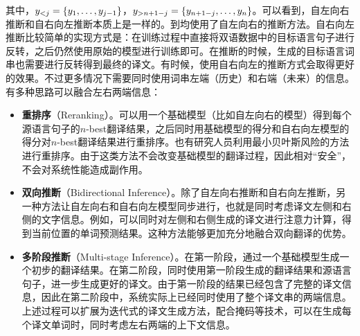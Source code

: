 \noindent 其中，${y}_{<j}=\{y_1,\dots,y_{j-1}\}$，${y}_{>n+1-j}=\{y_{n+1-j},\dots,y_n\}$。可以看到，自左向右推断和自右向左推断本质上是一样的。{\chapterten}到{\chaptertwelve}均使用了自左向右的推断方法。自右向左推断比较简单的实现方式是：在训练过程中直接将双语数据中的目标语言句子进行反转，之后仍然使用原始的模型进行训练即可。在推断的时候，生成的目标语言词串也需要进行反转得到最终的译文。有时候，使用自右向左的推断方式会取得更好的效果。不过更多情况下需要同时使用词串左端（历史）和右端（未来）的信息。有多种思路可以融合左右两端信息：

\begin{itemize}
\vspace{0.5em}
\item {\small\sffamily\bfseries{重排序}}（Reranking）。可以用一个基础模型（比如自左向右的模型）得到每个源语言句子的$n$-best翻译结果，之后同时用基础模型的得分和自右向左模型的得分对$n$-best翻译结果进行重排序。也有研究人员利用最小贝叶斯风险的方法进行重排序。由于这类方法不会改变基础模型的翻译过程，因此相对“安全”，不会对系统性能造成副作用。
\vspace{0.5em}
\item {\small\sffamily\bfseries{双向推断}}（Bidirectional Inference）。除了自左向右推断和自右向左推断，另一种方法让自左向右和自右向左模型同步进行，也就是同时考虑译文左侧和右侧的文字信息。例如，可以同时对左侧和右侧生成的译文进行注意力计算，得到当前位置的单词预测结果。这种方法能够更加充分地融合双向翻译的优势。
\vspace{0.5em}
\item {\small\sffamily\bfseries{多阶段推断}}（Multi-stage Inference）。在第一阶段，通过一个基础模型生成一个初步的翻译结果。在第二阶段，同时使用第一阶段生成的翻译结果和源语言句子，进一步生成更好的译文。由于第一阶段的结果已经包含了完整的译文信息，因此在第二阶段中，系统实际上已经同时使用了整个译文串的两端信息。上述过程可以扩展为迭代式的译文生成方法，配合掩码等技术，可以在生成每个译文单词时，同时考虑左右两端的上下文信息。
\vspace{0.5em}
\end{itemize}

